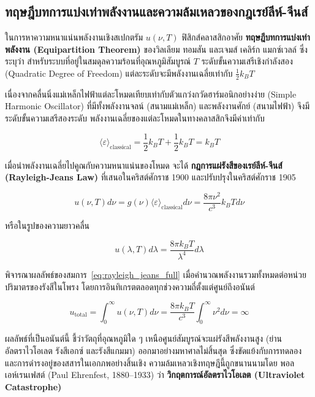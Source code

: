 \subsection{ทฤษฎีบทการแบ่งเท่าพลังงานและความล้มเหลวของกฎเรย์ลีห์-จีนส์}

ในการหาความหนาแน่นพลังงานเชิงสเปกตรัม $u(\nu, T)$ ฟิสิกส์คลาสสิกอาศัย \textbf{ทฤษฎีบทการแบ่งเท่าพลังงาน (Equipartition Theorem)} ของวิลเลียม ทอมสัน และเจมส์ เคลิร์ก แมกซ์เวลล์ ซึ่งระบุว่า สำหรับระบบที่อยู่ในสมดุลความร้อนที่อุณหภูมิสัมบูรณ์ $T$ ระดับขั้นความเสรีเชิงกำลังสอง (Quadratic Degree of Freedom) แต่ละระดับจะมีพลังงานเฉลี่ยเท่ากับ $\frac{1}{2}k_B T$

เนื่องจากคลื่นนิ่งแม่เหล็กไฟฟ้าแต่ละโหมดเทียบเท่ากับตัวแกว่งกวัดฮาร์มอนิกอย่างง่าย (Simple Harmonic Oscillator) ที่มีทั้งพลังงานจลน์ (สนามแม่เหล็ก) และพลังงานศักย์ (สนามไฟฟ้า) จึงมีระดับขั้นความเสรีสองระดับ พลังงานเฉลี่ยของแต่ละโหมดในทางคลาสสิกจึงมีค่าเท่ากับ

\begin{equation}
\langle \varepsilon \rangle_{\text{classical}} = \frac{1}{2}k_B T + \frac{1}{2}k_B T = k_B T
\label{eq:classical_mean_energy}
\end{equation}

เมื่อนำพลังงานเฉลี่ยไปคูณกับความหนาแน่นของโหมด จะได้ \textbf{กฎการแผ่รังสีของเรย์ลีห์-จีนส์ (Rayleigh-Jeans Law)} ที่เสนอในคริสต์ศักราช 1900 และปรับปรุงในคริสต์ศักราช 1905

\begin{equation}
u(\nu, T) d\nu = g(\nu) \langle \varepsilon \rangle_{\text{classical}} d\nu = \frac{8\pi\nu^2}{c^3} k_B T d\nu
\label{eq:rayleigh_jeans_full}
\end{equation}

หรือในรูปของความยาวคลื่น

\begin{equation}
u(\lambda, T) d\lambda = \frac{8\pi k_B T}{\lambda^4} d\lambda
\label{eq:rayleigh_jeans_lambda_full}
\end{equation}

พิจารณาผลลัพธ์ของสมการ~\eqref{eq:rayleigh_jeans_full} เมื่อคำนวณพลังงานรวมทั้งหมดต่อหน่วยปริมาตรของรังสีในโพรง โดยการอินทิเกรตตลอดทุกช่วงความถี่ตั้งแต่ศูนย์ถึงอนันต์

\begin{equation}
u_{\text{total}} = \int_0^\infty u(\nu, T) d\nu = \frac{8\pi k_B T}{c^3} \int_0^\infty \nu^2 d\nu = \infty
\label{eq:uv_catastrophe_integral}
\end{equation}

ผลลัพธ์ที่เป็นอนันต์นี้ ชี้ว่าวัตถุที่อุณหภูมิใด ๆ เหนือศูนย์สัมบูรณ์จะแผ่รังสีพลังงานสูง (ย่านอัลตราไวโอเลต รังสีเอกซ์ และรังสีแกมมา) ออกมาอย่างมหาศาลไม่สิ้นสุด ซึ่งขัดแย้งกับการทดลองและการดำรงอยู่ของสสารในเอกภพอย่างสิ้นเชิง ความล้มเหลวเชิงทฤษฎีนี้ถูกขนานนามโดย พอล เอห์เรนเฟสต์ (Paul Ehrenfest, 1880--1933) ว่า \textbf{วิกฤตการณ์อัลตราไวโอเลต (Ultraviolet Catastrophe)}

